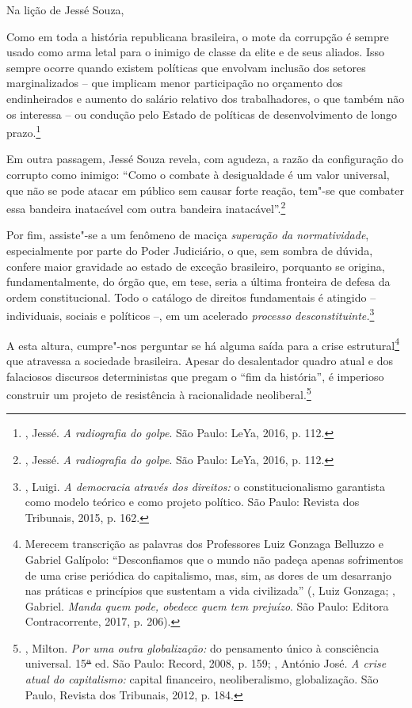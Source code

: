 Na lição de Jessé Souza,

Como em toda a história republicana brasileira, o mote da corrupção é
sempre usado como arma letal para o inimigo de classe da elite e de seus
aliados. Isso sempre ocorre quando existem políticas que envolvam
inclusão dos setores marginalizados -- que implicam menor participação
no orçamento dos endinheirados e aumento do salário relativo dos
trabalhadores, o que também não os interessa -- ou condução pelo Estado
de políticas de desenvolvimento de longo prazo.\footnote{, Jessé.
  \emph{A radiografia do golpe}. São Paulo: LeYa, 2016, p. 112.}

Em outra passagem, Jessé Souza revela, com agudeza, a razão da
configuração do corrupto como inimigo: ``Como o combate à desigualdade é
um valor universal, que não se pode atacar em público sem causar forte
reação, tem"-se que combater essa bandeira inatacável com outra bandeira
inatacável''.\footnote{, Jessé. \emph{A radiografia do golpe}. São
  Paulo: LeYa, 2016, p. 112.}

Por fim, assiste"-se a um fenômeno de maciça \emph{superação da
normatividade}, especialmente por parte do Poder Judiciário, o que, sem
sombra de dúvida, confere maior gravidade ao estado de exceção
brasileiro, porquanto se origina, fundamentalmente, do órgão que, em
tese, seria a última fronteira de defesa da ordem constitucional. Todo o
catálogo de direitos fundamentais é atingido -- individuais, sociais e
políticos --, em um acelerado \emph{processo desconstituinte.}\footnote{,
  Luigi. \emph{A democracia através dos direitos:} o constitucionalismo
  garantista como modelo teórico e como projeto político. São Paulo:
  Revista dos Tribunais, 2015, p. 162.}

A esta altura, cumpre"-nos perguntar se há alguma saída para a crise
estrutural\footnote{Merecem transcrição as palavras dos Professores Luiz
  Gonzaga Belluzzo e Gabriel Galípolo: ``Desconfiamos que o mundo não
  padeça apenas sofrimentos de uma crise periódica do capitalismo, mas,
  sim, as dores de um desarranjo nas práticas e princípios que sustentam
  a vida civilizada'' (, Luiz Gonzaga; , Gabriel.
  \emph{Manda quem pode, obedece quem tem prejuízo}. São Paulo: Editora
  Contracorrente, 2017, p. 206).} que atravessa a sociedade brasileira.
Apesar do desalentador quadro atual e dos falaciosos discursos
deterministas que pregam o ``fim da história'', é imperioso construir um
projeto de resistência à racionalidade neoliberal.\footnote{,
  Milton. \emph{Por uma outra globalização:} do pensamento único à
  consciência universal. 15\sout{ª} ed. São Paulo: Record, 2008, p. 159;
  , António José. \emph{A crise atual do capitalismo:}
  capital financeiro, neoliberalismo, globalização. São Paulo, Revista
  dos Tribunais, 2012, p. 184.}

